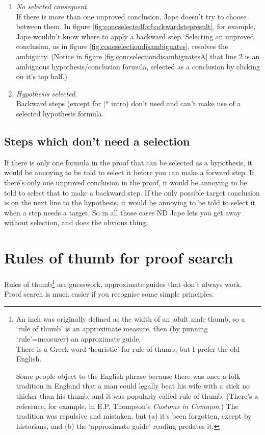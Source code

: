 \documentclass[11pt]{book}
\newcommand{\figref}[1]{figure \ref{fig:#1}}
\begin{document}
\begin{enumerate}
\item \emph{No selected consequent.}\\
If there is more than one unproved conclusion, Jape doesn't try to choose between them. In \figref{concselectedforbackwardstepresult}, for example, Jape wouldn't know where to apply a backward step. Selecting an unproved conclusion, as in \figref{concselectiondisambiguates}, resolves the ambiguity. (Notice in \figref{concselectiondisambiguatesA} that line 2 is an ambiguous hypothesis/conclusion formula, selected as a conclusion by clicking on it's top half.)\\

\item \emph{Hypothesis selected}.\\
Backward steps (except for $|*$ intro) don't need and can't make use of a selected hypothesis formula. 

\end{enumerate}

\section{Steps which don't need a selection}

If there is only one formula in the proof that can be selected 
as a hypothesis, it would be annoying to be told to select it 
before you can make a forward step. If there's only one unproved 
conclusion in the proof, it would be annoying to be told to select 
that to make a backward step. If the only possible target conclusion 
is on the next line to the hypothesis, it would be annoying to 
be told to select it when a step needs a target. So in all those 
cases ND Jape lets you get away without selection, and does the 
obvious thing.


\chapter{Rules of thumb for proof search}

Rules of thumb\footnote{An inch was originally defined as the width 
of an adult male thumb, so a `rule of thumb' is an approximate 
measure, then (by punning `rule'=measurer) an approximate guide.\\
There is a Greek word `heuristic' for rule-of-thumb, but I 
prefer the old English. 

Some people object to the English phrase 
because there was once a folk tradition in England that a man 
could legally beat his wife with a stick no thicker than his 
thumb, and it was popularly called rule of thumb. (There's 
a reference, for example, in E.P. Thompson's \textit{Customs in Common}.) The tradition 
was repulsive and mistaken, but (a) it's been forgotten, 
except by historians, and (b) the `approximate guide' reading 
predates it.} are guesswork, approximate guides that don't always 
work. Proof search is much easier if you recognise some simple principles.
\end{document}
